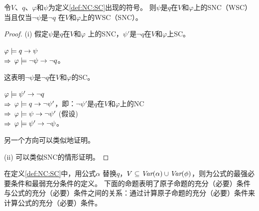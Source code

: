 \begin{proposition}[对偶性]\label{dual}
	令$V$、$q$、$\varphi$和$\psi$为定义\ref{def:NC:SC}出现的符号。
	则$\psi$是$q$在$V$和$\varphi$上的SNC（WSC）当且仅当$\neg \psi$是$\neg q$ 在$V$和$\varphi$上的WSC（SNC）。
\end{proposition}
\begin{proof}
	(i) 假定$\psi$是$q$在$V$和$\varphi$ 上的SNC，$\psi'$是$\neg q$在$V$和$\varphi$上SC。
	
	$\varphi \models q \rightarrow \psi$ \\
	$\Rightarrow$ $\varphi \models \neg \psi \rightarrow \neg q$。
	
	这表明$\neg \psi$是$\neg q$在$V$和$\varphi$的SC。
	
	$\varphi \models \psi' \rightarrow \neg q$\\
	$\Rightarrow$ $\varphi \models q \rightarrow \neg \psi'$，即：$\neg \psi'$是$q$在$V$和$\varphi$上的NC\\
	$\Rightarrow$ $\varphi \models \psi \rightarrow \neg \psi'$ \hfill (假设)\\
	$\Rightarrow$ $\varphi \models \psi' \rightarrow \neg \psi$。
	
	另一个方向可以类似地证明。
	
	(ii) 可以类似SNC的情形证明。
\end{proof}


在定义\ref{def:NC:SC}中，用公式$\alpha$ 替换$q$，$V\subseteq \textit{Var}(\alpha) \cup \textit{Var}(\phi)$，则为公式的最强必要条件和最弱充分条件的定义。
下面的命题表明了原子命题的充分（必要）条件与公式的充分（必要）条件之间的关系：通过计算原子命题的充分（必要）条件来计算公式的充分（必要）条件。



